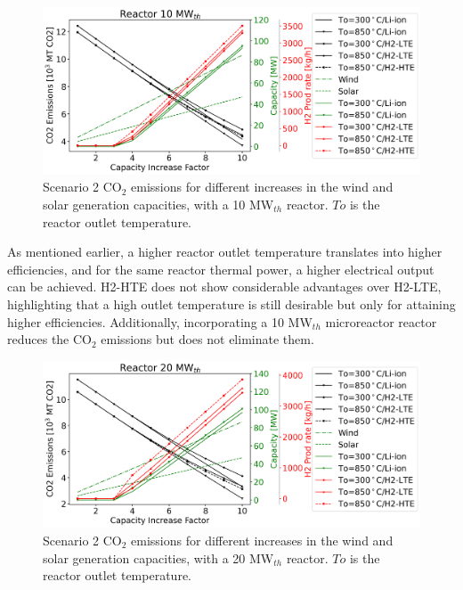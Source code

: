 \documentclass{anstrans}
\begin{document}
\begin{figure}[htbp!] %
    \centering
    \includegraphics[width=0.99\linewidth]{figures/scenario2-10-summer-emissions}
    \hfill
    \caption{Scenario 2 CO$_2$ emissions for different increases in the wind and solar generation capacities, with a 10 MW$_{th}$ reactor. $To$ is the reactor outlet temperature.}
    \label{fig:2-summer-10-emissions}
\end{figure}

As mentioned earlier, a higher reactor outlet temperature translates into higher efficiencies, and for the same reactor thermal power, a higher electrical output can be achieved.
H2-HTE does not show considerable advantages over H2-LTE, highlighting that a high outlet temperature is still desirable but only for attaining higher efficiencies.
Additionally, incorporating a 10 MW$_{th}$ microreactor reactor reduces the CO$_2$ emissions but does not eliminate them.

\begin{figure}[htbp!] %
    \centering
    \includegraphics[width=0.99\linewidth]{figures/scenario2-20-summer-emissions}
    \hfill
    \caption{Scenario 2 CO$_2$ emissions for different increases in the wind and solar generation capacities, with a 20 MW$_{th}$ reactor. $To$ is the reactor outlet temperature.}
    \label{fig:2-summer-20-emissions}
\end{figure}
\end{document}
